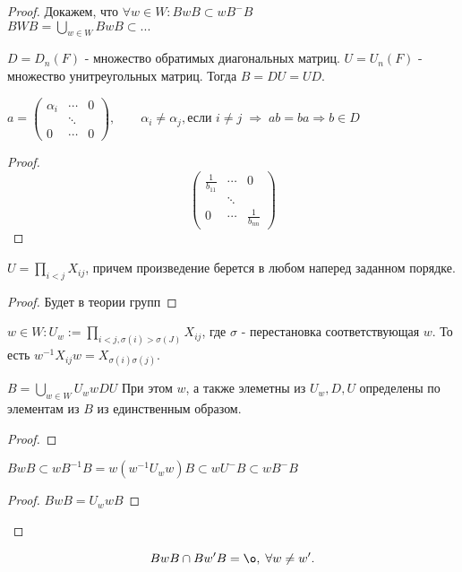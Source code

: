 \documentclass[12pt]{report}
\begin{document}
\begin{proof}
    Докажем, что $\forall w \in  W: BwB \subset w B^- B$ \\
    $B W B = \bigcup _{w \in  W} B w B \subset ...$%
    \begin{lm}[1]
	$D = D_n (F)$ - множество обратимых диагональных матриц. $U = U_n(F)$ - множество унитреугольных матриц. Тогда $B = D U = U D$.
    \end{lm}
    \begin{prac}
        $a = \left ( 
        \begin{array}{ccc}
	    \alpha_i & \cdots & 0 \\
	     & \ddots &\\
	    0 & \cdots & 0
        \end{array}
        \right ), \qquad \alpha _i \ne \alpha_j , \mbox{если } i \ne j \; \Rightarrow \; ab = ba \Rightarrow b \in  D$
    \end{prac}
    \begin{proof}
    $$
    \left ( 
    \begin{array}{ccc}
	\frac{1}{b_{11}} & \cdots & 0 \\
	&\ddots & \\
	0 & \cdots & \frac{1}{b_{nn}}
    \end{array}
    \right )
    $$%
    \end{proof}
    \begin{lm}[2]
	$U = \prod_{i < j} X_{ij}$, причем произведение берется в любом наперед заданном порядке.
    \end{lm}
     \begin{proof}
        Будет в теории групп
    \end{proof}
    \begin{name}
	$w \in  W : U_w := \prod_{i < j, \sigma (i) >\sigma(J)} X_{ij}$, где $\sigma$ - перестановка соответствующая $w$.
	То есть $w^{-1} X _{ij} w = X_{\sigma(i) \sigma(j)}$.
    \end{name}
    \begin{thm}
	$B = \bigcup _{w \in  W} U_w w D U$
	При этом $ w$, а также элеметны из $U_w, D, U$ определены по элементам из $B$  из единственным образом.
    \end{thm}
    \begin{proof}
    \end{proof}
    \begin{cor}
	$BwB \subset w B^{-1}B = w (w^{-1} U_w w)B \subset w U^{-} B \subset w B ^{-} B$
    \end{cor}
    \begin{proof}
        $B w B = U_w w B$
    \end{proof}
\end{proof}
\begin{st}
    \[
    B w B \cap B w ' B = \o ,\; \forall w \ne w'
    .\] 
\end{st}
\end{document}
